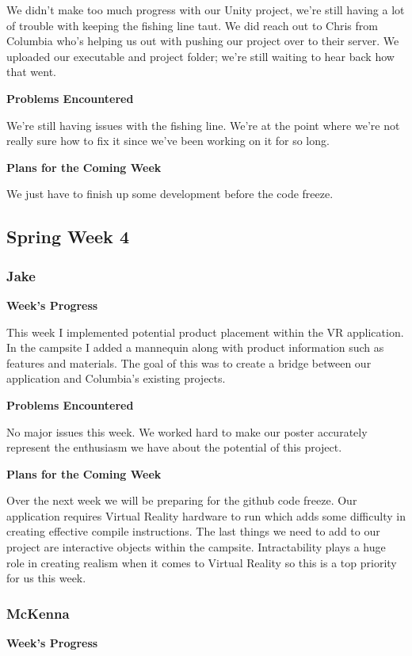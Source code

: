 \documentclass[10pt,journal,compsoc,onecolumn, draftclsnofoot]{IEEEtran}
\begin{document}
We didn't make too much progress with our Unity project, we're still having a lot of trouble with keeping the fishing line taut. We did reach out to Chris from Columbia who's helping us out with pushing our project over to their server. We uploaded our executable and project folder; we're still waiting to hear back how that went.

\noindent \textbf{Problems Encountered}

We're still having issues with the fishing line. We're at the point where we're not really sure how to fix it since we've been working on it for so long.

\noindent \textbf{Plans for the Coming Week}

We just have to finish up some development before the code freeze.

\subsection{Spring Week 4}
\subsubsection{Jake}
\noindent \textbf{Week's Progress}

This week I implemented potential product placement within the VR application. In the campsite I added a mannequin along with product information such as features and materials. The goal of this was to create a bridge between our application and Columbia's existing projects.

\noindent \textbf{Problems Encountered}

No major issues this week. We worked hard to make our poster accurately represent the enthusiasm we have about the potential of this project.

\noindent \textbf{Plans for the Coming Week}

Over the next week we will be preparing for the github code freeze. Our application requires Virtual Reality hardware to run which adds some difficulty in creating effective compile instructions. The last things we need to add to our project are interactive objects within the campsite. Intractability plays a huge role in creating realism when it comes to Virtual Reality so this is a top priority for us this week.

\subsubsection{McKenna}
\noindent \textbf{Week's Progress}
\end{document}
